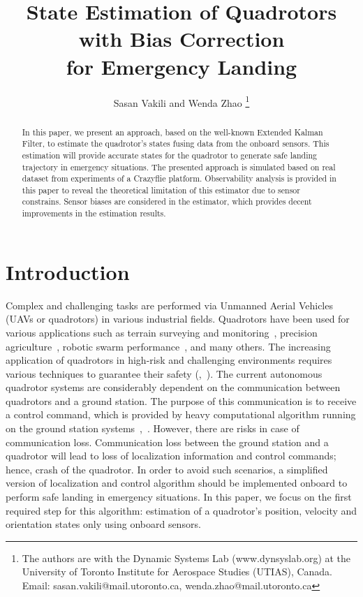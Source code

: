 \documentclass[letterpaper, 10 pt, conference]{ieeeconf}  %
\title{\LARGE \bf
State Estimation of Quadrotors with Bias Correction \\ for Emergency Landing
}
\author{Sasan Vakili and Wenda Zhao%
\thanks{The authors are with the Dynamic Systems Lab (www.dynsyslab.org) at
the University of Toronto Institute for Aerospace Studies (UTIAS), Canada.
Email: sasan.vakili@mail.utoronto.ca, wenda.zhao@mail.utoronto.ca}%
}
\begin{document}
\maketitle
\thispagestyle{empty}
\pagestyle{empty}


\begin{abstract}

In this paper, we present an approach, based on the well-known Extended Kalman Filter, to estimate the quadrotor's states fusing data from the onboard sensors. This estimation will provide accurate states for the quadrotor to generate safe landing trajectory in emergency situations. The presented approach is simulated based on real dataset from experiments of a Crazyflie platform. Observability analysis is provided in this paper to reveal the theoretical limitation of this estimator due to sensor constrains. Sensor biases are considered in the estimator, which provides decent improvements in the estimation results.
\end{abstract}


\section{Introduction} 

Complex and challenging tasks are performed via Unmanned Aerial Vehicles (UAVs or quadrotors) in various industrial fields. Quadrotors have been used for various applications such as terrain surveying and monitoring~\cite{bamford-fragblast12}, precision agriculture~\cite{gonzalez2013using}, robotic swarm performance~\cite{li2017learning}, and many others. The increasing application of quadrotors in high-risk and challenging environments requires various techniques to guarantee their safety (\cite{berkenkamp2016safe},~\cite{warren2018there}). The current autonomous quadrotor systems are considerably dependent on the communication between quadrotors and a ground station. The purpose of this communication is to receive a control command, which is provided by heavy computational algorithm running on the ground station systems~\cite{luis2018trajectory},~\cite{du2018fast}. However, there are risks in case
of communication loss. Communication loss between the ground station and a quadrotor will lead to loss of
localization information and control commands; hence, crash of the quadrotor. In order to avoid such scenarios, a simplified version of localization and control algorithm should be implemented onboard to perform safe landing in emergency situations. In this paper, we focus on the first required step for this algorithm: estimation of a quadrotor's position, velocity and orientation states only using onboard sensors.
\end{document}
